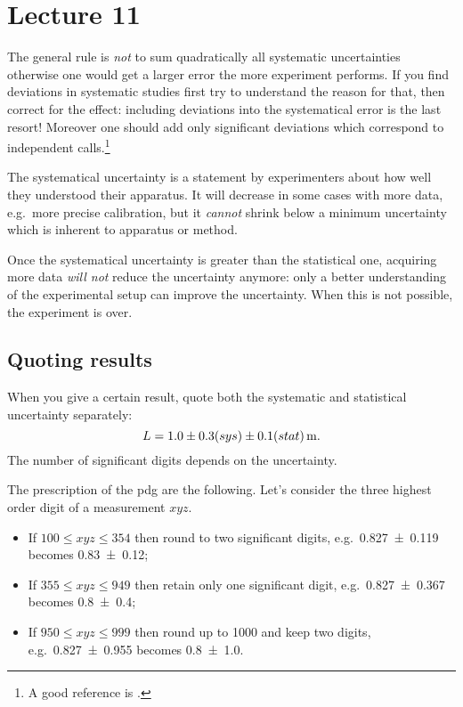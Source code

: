 \documentclass[
	10pt,
	draft
]{scrreprt}
\begin{document}
	\chapter{Lecture 11}

The general rule is \emph{not} to sum quadratically all systematic uncertainties otherwise one would get a larger error the more experiment performs.
If you find deviations in systematic studies first try to understand the reason for that, then correct for the effect: including deviations into the systematical error is the last resort!
Moreover one should add only significant deviations which correspond to independent calls.\footnote{A good reference is \cite{barlow:syst_err}.}


The systematical uncertainty is a statement by experimenters about how well they understood their apparatus.
It will decrease in some cases with more data, e.g.~more precise calibration, but it \emph{cannot} shrink below a minimum uncertainty which is inherent to apparatus or method.


Once the systematical uncertainty is greater than the statistical one, acquiring more data \emph{will not} reduce the uncertainty anymore: only a better understanding of the experimental setup can improve the uncertainty.
When this is not possible, the experiment is over.


		\section{Quoting results}
When you give a certain result, quote  both the systematic and statistical uncertainty separately:
\begin{equation}
L = \SI[parse-numbers=false]{1.0 \pm 0.3 (sys) \pm 0.1 (stat)}{\meter}.
\end{equation}
The number of significant digits depends on the uncertainty.


The prescription of the \ac{pdg} are the following.
Let's consider the three highest order digit of a measurement $xyz$.
\begin{itemize}
	\item
If $\num{100}\le xyz \le \num{354}$ then round to two significant digits, e.g.~\num{.827 \pm .119} becomes \num{.83 \pm .12};
	\item
If $\num{355}\le xyz \le \num{949}$ then retain only one significant digit, e.g.~\num{.827 \pm .367} becomes \num{.8 \pm .4};
	\item
If $\num{950}\le xyz \le \num{999}$ then round up to \num{1000} and keep two digits, e.g.~\num{.827 \pm .955} becomes \num{.8 \pm 1.0}.
\end{itemize}
\end{document}
